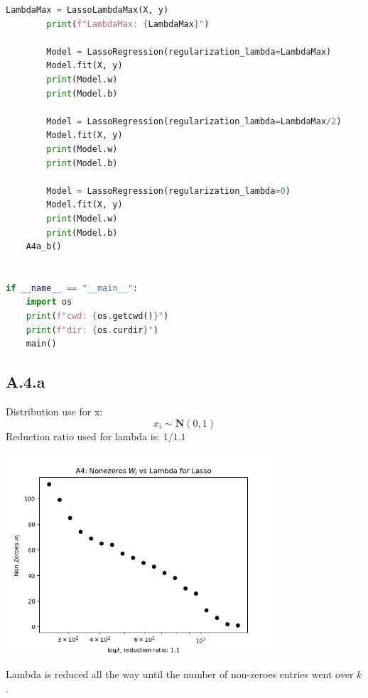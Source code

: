 \documentclass[]{article}
\begin{document}
\begin{lstlisting}[language=python]
        LambdaMax = LassoLambdaMax(X, y)
        print(f"LambdaMax: {LambdaMax}")

        Model = LassoRegression(regularization_lambda=LambdaMax)
        Model.fit(X, y)
        print(Model.w)
        print(Model.b)

        Model = LassoRegression(regularization_lambda=LambdaMax/2)
        Model.fit(X, y)
        print(Model.w)
        print(Model.b)

        Model = LassoRegression(regularization_lambda=0)
        Model.fit(X, y)
        print(Model.w)
        print(Model.b)
    A4a_b()


if __name__ == "__main__":
    import os
    print(f"cwd: {os.getcwd()}")
    print(f"dir: {os.curdir}")
    main()
    \end{lstlisting}
    \subsection*{A.4.a}
        Distribution use for x: 
        $$
            x_i \sim \mathbf{N}(0, 1)
        $$
        Reduction ratio used for lambda is: $1/1.1$
        \begin{center}
            \includegraphics[width=10cm]{A4a-plot.png}
        \end{center}
        Lambda is reduced all the way until the number of non-zeroes entries went over $k$. 
\end{document}
